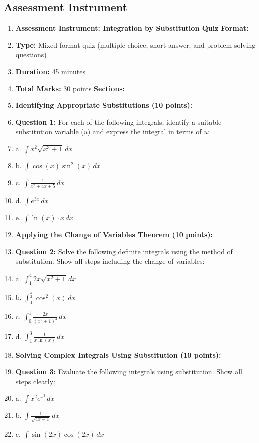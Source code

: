 \subsection{Assessment Instrument}

\begin{enumerate}
    \item \textbf{Assessment Instrument: Integration by Substitution Quiz} \textbf{Format:}
    \item \textbf{Type:} Mixed-format quiz (multiple-choice, short answer, and problem-solving questions)
    \item \textbf{Duration:} 45 minutes
    \item \textbf{Total Marks:} 30 points \textbf{Sections:}
    \item \textbf{Identifying Appropriate Substitutions (10 points):}
    \item \textbf{Question 1:} For each of the following integrals, identify a suitable substitution variable ($u$) and express the integral in terms of $u$:
    \item a. $\int x^2 \sqrt{x^3 + 1} \, dx$
    \item b. $\int \cos(x) \sin^2(x) \, dx$
    \item c. $\int \frac{1}{x^2 + 4x + 5} \, dx$
    \item d. $\int e^{3x} \, dx$
    \item e. $\int \ln(x) \cdot x \, dx$
    \item \textbf{Applying the Change of Variables Theorem (10 points):}
    \item \textbf{Question 2:} Solve the following definite integrals using the method of substitution. Show all steps including the change of variables:
    \item a. $\int_{1}^{4} 2x \sqrt{x^2 + 1} \, dx$
    \item b. $\int_{0}^{\frac{\pi}{2}} \cos^2(x) \, dx$
    \item c. $\int_{0}^{1} \frac{2x}{(x^2 + 1)^2} \, dx$
    \item d. $\int_{1}^{3} \frac{1}{x \ln(x)} \, dx$
    \item \textbf{Solving Complex Integrals Using Substitution (10 points):}
    \item \textbf{Question 3:} Evaluate the following integrals using substitution. Show all steps clearly:
    \item a. $\int x^2 e^{x^3} \, dx$
    \item b. $\int \frac{1}{\sqrt{4x - 1}} \, dx$
    \item c. $\int \sin(2x) \cos(2x) \, dx$

\end{enumerate}
